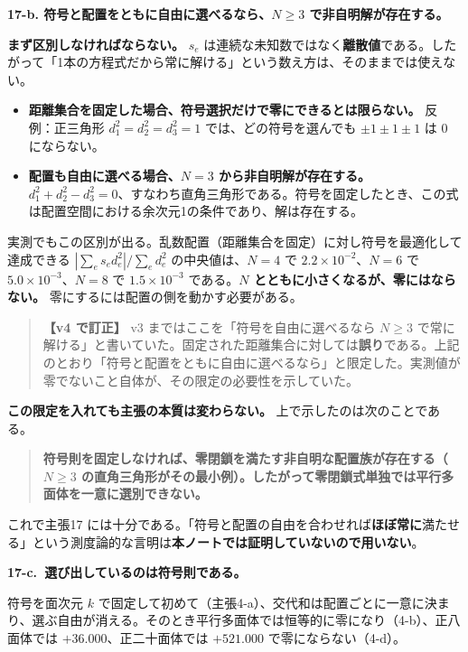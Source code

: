 \documentclass[
  10pt,
]{ltjsarticle}
\providecommand{\tightlist}{%
  \setlength{\itemsep}{0pt}\setlength{\parskip}{0pt}}
\begin{document}
\textbf{17-b. 符号と配置をともに自由に選べるなら、\(N \ge 3\)
で非自明解が存在する。}

\textbf{まず区別しなければならない。} \(s_e\)
は連続な未知数ではなく\textbf{離散値}である。したがって「1本の方程式だから常に解ける」という数え方は、そのままでは使えない。

\begin{itemize}
\tightlist
\item
  \textbf{距離集合を固定した場合、符号選択だけで零にできるとは限らない。}
  反例：正三角形 \(d_1^2 = d_2^2 = d_3^2 = 1\) では、どの符号を選んでも
  \(\pm1\pm1\pm1\) は \(0\) にならない。
\item
  \textbf{配置も自由に選べる場合、\(N=3\) から非自明解が存在する。}
  \(d_1^2 + d_2^2 - d_3^2 = 0\)、すなわち直角三角形である。符号を固定したとき、この式は配置空間における余次元1の条件であり、解は存在する。
\end{itemize}

実測でもこの区別が出る。乱数配置（距離集合を固定）に対し符号を最適化して達成できる
\(|\sum_e s_e d_e^2| / \sum_e d_e^2\) の中央値は、\(N = 4\) で
\(2.2\times10^{-2}\)、\(N=6\) で \(5.0\times10^{-3}\)、\(N=8\) で
\(1.5\times10^{-3}\) である。\textbf{\(N\)
とともに小さくなるが、零にはならない。}
零にするには配置の側を動かす必要がある。

\begin{quote}
\textbf{【v4 で訂正】} v3 まではここを「符号を自由に選べるなら \(N\ge3\)
で常に解ける」と書いていた。固定された距離集合に対しては\textbf{誤り}である。上記のとおり「符号と配置をともに自由に選べるなら」と限定した。実測値が零でないこと自体が、その限定の必要性を示していた。
\end{quote}

\textbf{この限定を入れても主張の本質は変わらない。}
上で示したのは次のことである。

\begin{quote}
\textbf{符号則を固定しなければ、零閉鎖を満たす非自明な配置族が存在する（\(N\ge3\)
の直角三角形がその最小例）。したがって零閉鎖式単独では平行多面体を一意に選別できない。}
\end{quote}

これで主張17
には十分である。「符号と配置の自由を合わせれば\textbf{ほぼ常に}満たせる」という測度論的な言明は\textbf{本ノートでは証明していないので用いない}。

\textbf{17-c.~選び出しているのは符号則である。}

符号を面次元 \(k\)
で固定して初めて（主張4-a）、交代和は配置ごとに一意に決まり、選ぶ自由が消える。そのとき平行多面体では恒等的に零になり（4-b）、正八面体では
\(+36.000\)、正二十面体では \(+521.000\) で零にならない（4-d）。
\end{document}
